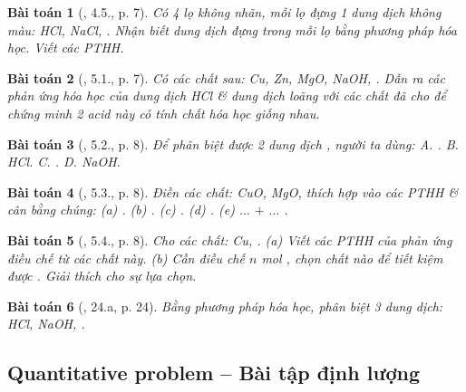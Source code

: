 \documentclass{article}
\newtheorem{baitoan}{Bài toán}
\begin{document}
\begin{baitoan}[\cite{SBT_Hoa_Hoc_9}, 4.5., p. 7]
	Có 4 lọ không nhãn, mỗi lọ đựng 1 dung dịch không màu: \emph{HCl, NaCl, }. Nhận biết dung dịch đựng trong mỗi lọ bằng phương pháp hóa học. Viết các PTHH.
\end{baitoan}

\begin{baitoan}[\cite{SBT_Hoa_Hoc_9}, 5.1., p. 7]
	Có các chất sau: \emph{Cu, Zn, MgO, NaOH, }. Dẫn ra các phản ứng hóa học của dung dịch \emph{HCl} \& dung dịch \emph{} loãng với các chất đã cho để chứng minh 2 acid này có tính chất hóa học giống nhau.
\end{baitoan}

\begin{baitoan}[\cite{SBT_Hoa_Hoc_9}, 5.2., p. 8]
	Để phân biệt được 2 dung dịch \emph{}, người ta dùng: {\sf A.} \emph{}. {\sf B.} \emph{HCl}. {\sf C.} \emph{}. {\sf D.} \emph{NaOH}.
\end{baitoan}

\begin{baitoan}[\cite{SBT_Hoa_Hoc_9}, 5.3., p. 8]
	Điền các chất: \emph{CuO, MgO, } thích hợp vào các PTHH \& cân bằng chúng: (a) \emph{}. (b) \emph{}. (c) \emph{}. (d) \emph{}. (e) $\ldots$ $+$ $\ldots$ \emph{}.
\end{baitoan}

\begin{baitoan}[\cite{SBT_Hoa_Hoc_9}, 5.4., p. 8]
	Cho các chất: \emph{Cu, }. (a) Viết các PTHH của phản ứng điều chế \emph{} từ các chất này. (b) Cần điều chế $n$ \emph{mol }, chọn chất nào để tiết kiệm được \emph{}. Giải thích cho sự lựa chọn.
\end{baitoan}

\begin{baitoan}[\cite{An_350_BT_Hoa_Hoc_9}, 24.a, p. 24]
	Bằng phương pháp hóa học, phân biệt 3 dung dịch: \emph{HCl, NaOH, }.
\end{baitoan}

\subsection{Quantitative problem -- Bài tập định lượng}
\end{document}
